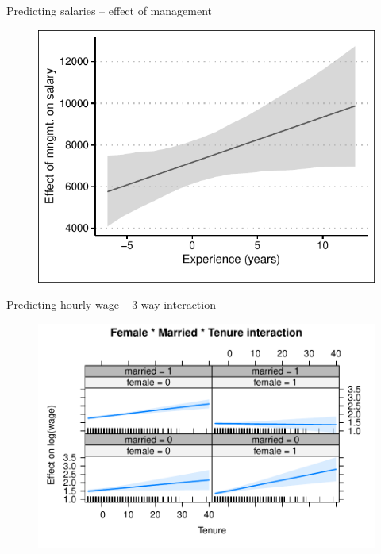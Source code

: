\documentclass[12pt,english,pdf,xcolor=dvipsnames,aspectratio=169,handout]{beamer}\usepackage[]{graphicx}\usepackage[]{xcolor}
\begin{document}
\begin{frame}{Predicting salaries -- effect of management}


\begin{figure}
\centering
\includegraphics{../04-graphs/03-02}
\end{figure}

\end{frame}


\begin{frame}{Predicting hourly wage -- 3-way interaction}


\begin{figure}
\centering
\includegraphics[scale=0.75]{../04-graphs/03-03}
\end{figure}

\end{frame}
\end{document}
